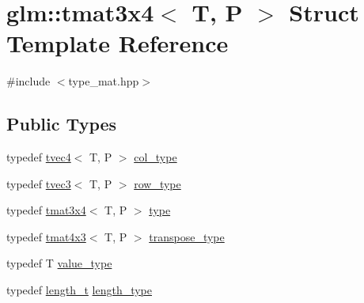 \hypertarget{structglm_1_1tmat3x4}{}\section{glm\+::tmat3x4$<$ T, P $>$ Struct Template Reference}
\label{structglm_1_1tmat3x4}


{\ttfamily \#include $<$type\+\_\+mat.\+hpp$>$}

\subsection*{Public Types}
\begin{DoxyCompactItemize}
\item 
typedef \mbox{\hyperlink{structglm_1_1tvec4}{tvec4}}$<$ T, P $>$ \mbox{\hyperlink{structglm_1_1tmat3x4_aa4c8d5353d59216a2f0566ce462fbc81}{col\+\_\+type}}
\item 
typedef \mbox{\hyperlink{structglm_1_1tvec3}{tvec3}}$<$ T, P $>$ \mbox{\hyperlink{structglm_1_1tmat3x4_a8caa6e2dff35705a17659ac64c6b6782}{row\+\_\+type}}
\item 
typedef \mbox{\hyperlink{structglm_1_1tmat3x4}{tmat3x4}}$<$ T, P $>$ \mbox{\hyperlink{structglm_1_1tmat3x4_a5af4a499991893e6f02750a29572fd9a}{type}}
\item 
typedef \mbox{\hyperlink{structglm_1_1tmat4x3}{tmat4x3}}$<$ T, P $>$ \mbox{\hyperlink{structglm_1_1tmat3x4_a2ebc6db4342208ffbd1f3c643bcd81e2}{transpose\+\_\+type}}
\item 
typedef T \mbox{\hyperlink{structglm_1_1tmat3x4_a027b8d0c3639472d209b40f4cbe2361e}{value\+\_\+type}}
\item 
typedef \mbox{\hyperlink{namespaceglm_a090a0de2260835bee80e71a702492ed9}{length\+\_\+t}} \mbox{\hyperlink{structglm_1_1tmat3x4_ab857d16b90719de3b23d4fa423d20698}{length\+\_\+type}}
\end{DoxyCompactItemize}
